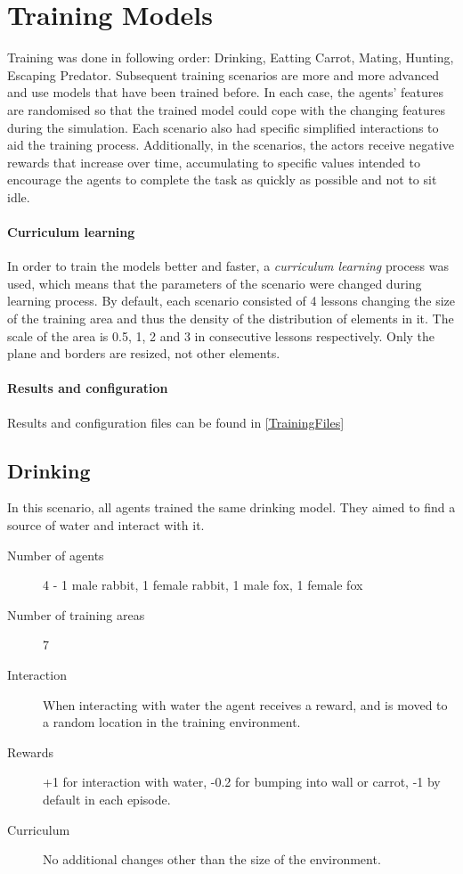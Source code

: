 \chapter{Training Models}
\label{trainingEnvironmentsDescription}
Training was done in following order: Drinking, Eatting Carrot, Mating, Hunting, Escaping Predator. Subsequent training scenarios are more and more advanced and use models that have been trained before. In each case, the agents' features are randomised so that the trained model could cope with the changing features during the simulation. Each scenario also had specific simplified interactions to aid the training process. Additionally, in the scenarios, the actors receive negative rewards that increase over time, accumulating to specific values intended to encourage the agents to complete the task as quickly as possible and not to sit idle.

\subsubsection{Curriculum learning}
In order to train the models better and faster, a \emph{curriculum learning} process was used, which means that the parameters of the scenario were changed during learning process. By default, each scenario consisted of 4 lessons changing the size of the training area and thus the density of the distribution of elements in it. The scale of the area is 0.5, 1, 2 and 3 in consecutive lessons respectively. Only the plane and borders are resized, not other elements.

\subsubsection{Results and configuration}
Results and configuration files can be found in \autoref{TrainingFiles}

\section{Drinking}
In this scenario, all agents trained the same drinking model. They aimed to find a source of water and interact with it.
\begin{description}
    \item[Number of agents] 4 - 1 male rabbit, 1 female rabbit, 1 male fox, 1 female fox
    \item[Number of training areas] 7
    \item[Interaction] When interacting with water the agent receives a reward, and is moved to a random location in the training environment.
    \item[Rewards] +1 for interaction with water, -0.2 for bumping into wall or carrot, -1 by default in each episode.
    \item[Curriculum] No additional changes other than the size of the environment.
\end{description}

